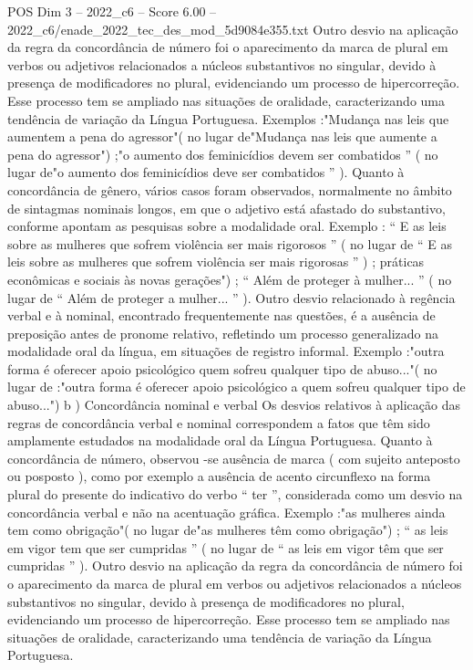 \begin{textsample}{POS Dim 3 – 2022\_c6 – Score 6.00 – 2022\_c6/enade\_2022\_tec\_des\_mod\_5d9084e355.txt}
Outro desvio na aplicação da regra da concordância de número foi o aparecimento da marca de plural em verbos ou adjetivos relacionados a núcleos substantivos no singular, devido à presença de modificadores no plural, evidenciando um processo de hipercorreção.
Esse processo tem se ampliado nas situações de oralidade, caracterizando uma tendência de variação da Língua Portuguesa.
Exemplos :"Mudança nas leis que aumentem a pena do agressor"( no lugar de"Mudança nas leis que aumente a pena do agressor") ;"o aumento dos feminicídios devem ser combatidos ” ( no lugar de"o aumento dos feminicídios deve ser combatidos ” ).
Quanto à concordância de gênero, vários casos foram observados, normalmente no âmbito de sintagmas nominais longos, em que o adjetivo está afastado do substantivo, conforme apontam as pesquisas sobre a modalidade oral.
Exemplo : “ E as leis sobre as mulheres que sofrem violência ser mais rigorosos ” ( no lugar de “ E as leis sobre as mulheres que sofrem violência ser mais rigorosas ” ) ; práticas econômicas e sociais às novas gerações") ; “ Além de proteger à mulher... ” ( no lugar de “ Além de proteger a mulher... ” ).
Outro desvio relacionado à regência verbal e à nominal, encontrado frequentemente nas questões, é a ausência de preposição antes de pronome relativo, refletindo um processo generalizado na modalidade oral da língua, em situações de registro informal.
Exemplo :"outra forma é oferecer apoio psicológico quem sofreu qualquer tipo de abuso..."( no lugar de :"outra forma é oferecer apoio psicológico a quem sofreu qualquer tipo de abuso...") b ) Concordância nominal e verbal Os desvios relativos à aplicação das regras de concordância verbal e nominal correspondem a fatos que têm sido amplamente estudados na modalidade oral da Língua Portuguesa.
Quanto à concordância de número, observou -se ausência de marca ( com sujeito anteposto ou posposto ), como por exemplo a ausência de acento circunflexo na forma plural do presente do indicativo do verbo “ ter ”, considerada como um desvio na concordância verbal e não na acentuação gráfica.
Exemplo :"as mulheres ainda tem como obrigação"( no lugar de"as mulheres têm como obrigação") ; “ as leis em vigor tem que ser cumpridas ” ( no lugar de “ as leis em vigor têm que ser cumpridas ” ).
Outro desvio na aplicação da regra da concordância de número foi o aparecimento da marca de plural em verbos ou adjetivos relacionados a núcleos substantivos no singular, devido à presença de modificadores no plural, evidenciando um processo de hipercorreção.
Esse processo tem se ampliado nas situações de oralidade, caracterizando uma tendência de variação da Língua Portuguesa.

\end{textsample}

